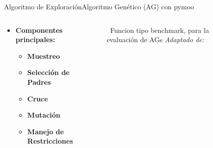 \begin{frame}{Algoritmo de Exploración}{Algoritmo Genético (AG) con pymoo}
    \begin{columns}
        \begin{column}{0.6\textwidth}
            \small
            \begin{itemize}
                \item \textbf{Componentes principales:}
                \begin{itemize}
                    \item \textbf{Muestreo}
                    \item \textbf{Selección de Padres}
                    \item \textbf{Cruce}
                    \item \textbf{Mutación}
                    \item \textbf{Manejo de Restricciones}
                \end{itemize}
            \end{itemize}
        \end{column}
        \begin{column}{0.4\textwidth}
            \centering
            \begin{figure}[H]
                \centering
                \vspace{-0.25cm}
                \caption{\tiny~Funcion tipo benchmark, para la evaluación de AGs \textit{Adaptado de:}~\cite{silva2018}}%
                \label{fig:genetic_algorithm}
            \end{figure}
        \end{column}
    \end{columns}
\end{frame}

